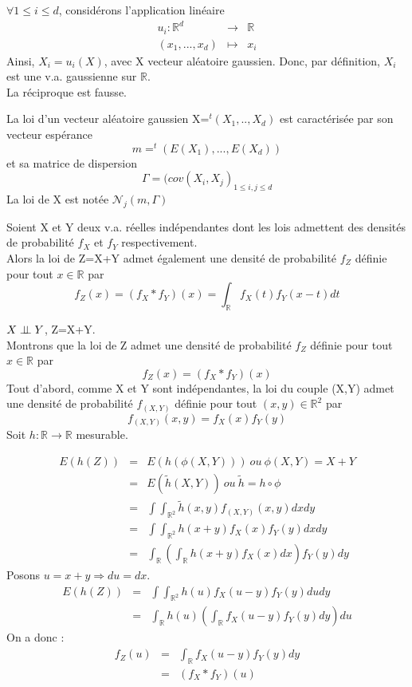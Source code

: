 \begin{rmq}
$\forall 1\leq i\leq d$, considérons l'application linéaire 
\begin{eqnarray*}
u_i : \mathbb{R}^d &\rightarrow& \mathbb{R}\\
(x_1,...,x_d) &\mapsto& x_i
\end{eqnarray*}
Ainsi, $X_i=u_i(X)$, avec X vecteur aléatoire gaussien. Donc, par définition, $X_i$ est une v.a. gaussienne sur $\mathbb{R}$. \\
La réciproque est fausse.
\end{rmq}

\begin{Prop}
La loi d'un vecteur aléatoire gaussien X=$^t(X_1,..,X_d)$ est caractérisée par son vecteur espérance \[m=^t(E(X_1),...,E(X_d))\] et sa matrice de dispersion 
\[\Gamma=(cov(X_i, X_j)_{1\leq i,j\leq d}\]
La loi de X est notée $\mathcal{N}_j(m,\Gamma)$
\end{Prop}

\begin{Prop}
Soient X et Y deux v.a. réelles indépendantes dont les lois admettent des densités de probabilité $f_X$ et $f_Y$ respectivement. \\
Alors la loi de Z=X+Y admet également une densité de probabilité $f_Z$ définie pour tout $x\in \mathbb{R}$ par 
\[f_Z(x)=(f_X*f_Y)(x) = \int_{\mathbb{R}} f_X(t) f_Y(x-t)dt\]
\end{Prop}

\begin{dem}
$X\perp \! \! \! \perp Y$, Z=X+Y. \\
Montrons que la loi de Z admet une densité de probabilité $f_Z$ définie pour tout $x\in \mathbb{R}$ par \[f_Z(x)=(f_X * f_Y)(x)\]
Tout d'abord, comme X et Y sont indépendantes, la loi du couple (X,Y) admet une densité de probabilité $f_{(X,Y)}$ définie pour tout $(x,y)\in \mathbb{R}^2$ par \[f_{(X,Y)}(x,y)=f_X(x) f_Y(y)\]
Soit $h:\mathbb{R} \rightarrow \mathbb{R}$ mesurable.

\begin{eqnarray*}
E(h(Z))&=&E(h(\phi(X,Y)))\ ou\ \phi(X,Y)=X+Y \\
&=& E(\tilde{h}(X,Y))\ ou\ \tilde{h}=h\circ \phi \\
&=& \int \int_{\mathbb{R}^2} \tilde{h}(x,y) f_{(X,Y)}(x,y) dx dy \\
&=& \int \int_{\mathbb{R}^2} h(x+y) f_X(x) f_Y(y) dx dy \\
&=& \int_{\mathbb{R}} \left(\int_{\mathbb{R}} h(x+y) f_X(x) dx \right) f_Y(y) dy
\end{eqnarray*}
Posons $u=x+y \Rightarrow du=dx$.
\begin{eqnarray*}
E(h(Z))&=& \int\int_{\mathbb{R}^2} h(u)f_X(u-y) f_Y(y) du dy \\
&=& \int_{\mathbb{R}} h(u) \left(\int_{\mathbb{R}} f_X(u-y) f_Y(y) dy  \right) du
\end{eqnarray*}
On a donc : \begin{eqnarray*}
f_Z(u)&=& \int_{\mathbb{R}} f_X(u-y)f_Y(y) dy \\
&=& (f_X*f_Y)(u)
\end{eqnarray*}
\end{dem}

